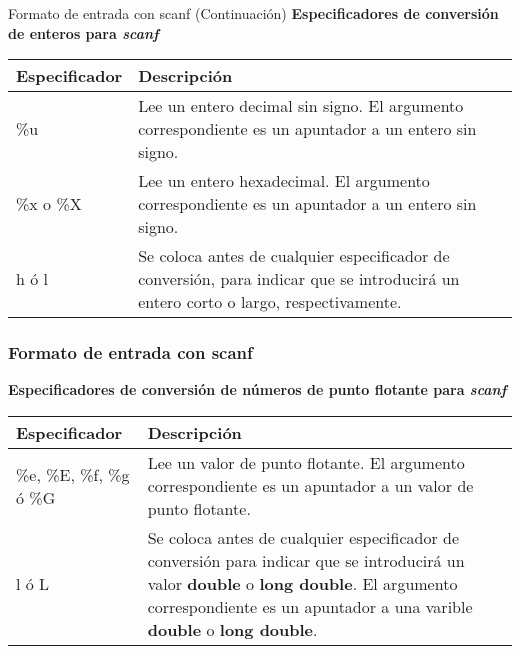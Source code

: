 \begin{frame}[t]{Formato de entrada con scanf (Continuación)}
\textbf{Especificadores de conversi\'on de enteros para \textit{scanf}}
\small
\begin{center}
	\begin{tabular}{lp{6cm}}
		\toprule
		\textbf{Especificador} & \textbf{Descripci\'on}\\
		\midrule
		\%u & Lee un entero decimal sin signo. El argumento correspondiente es un apuntador a un entero sin signo.\\
		\%x o \%X & Lee un entero hexadecimal. El argumento correspondiente es un apuntador a un entero sin signo.\\
		h \'o l & Se coloca antes de cualquier especificador de conversi\'on, para indicar que se introducir\'a un entero corto o largo, respectivamente.\\
		\bottomrule
	\end{tabular}
\end{center}
\end{frame}

\begin{frame}[t]
\frametitle{Formato de entrada con scanf}
\textbf{Especificadores de conversión de números de punto flotante para \textit{scanf}}\vspace{5mm}
\scriptsize
\centering
\begin{tabular}{lp{6cm}}
	\toprule
	\textbf{Especificador} & \textbf{Descripci\'on}\\
	\midrule
	\%e, \%E, \%f, \%g \'o \%G & Lee un valor de punto flotante. El argumento correspondiente es un apuntador a un valor de punto flotante.\\
	l \'o L & Se coloca antes de cualquier especificador de conversión para indicar que se introducir\'a un valor \textbf{double} o \textbf{long double}. El argumento correspondiente es un apuntador a una varible \textbf{double} o \textbf{long double}.\\ 
	\bottomrule
\end{tabular}
\end{frame}


